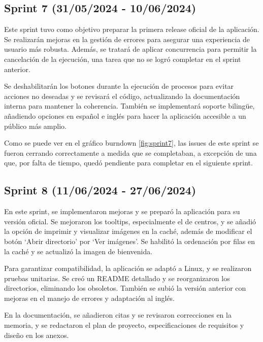 \subsection{Sprint 7 (31/05/2024 - 10/06/2024)}\label{sprint-7}

Este sprint tuvo como objetivo preparar la primera release oficial de la aplicación. Se realizarán mejoras en la gestión de errores para asegurar una experiencia de usuario más robusta. Además, se tratará de aplicar concurrencia para permitir la cancelación de la ejecución, una tarea que no se logró completar en el sprint anterior.

Se deshabilitarán los botones durante la ejecución de procesos para evitar acciones no deseadas y se revisará el código, actualizando la documentación interna para mantener la coherencia. También se implementará soporte bilingüe, añadiendo opciones en español e inglés para hacer la aplicación accesible a un público más amplio.


Como se puede ver en el gráfico burndown \ref{fig:sprint7}, las issues de este sprint se fueron cerrando correctamente a medida que se completaban, a excepción de una que, por falta de tiempo, quedó pendiente para completar en el siguiente sprint.


\subsection{Sprint 8 (11/06/2024 - 27/06/2024)}\label{sprint-8}

En este sprint, se implementaron mejoras y se preparó la aplicación para su versión oficial. Se mejoraron los tooltips, especialmente el de centros, y se añadió la opción de imprimir y visualizar imágenes en la caché, además de modificar el botón `Abrir directorio' por `Ver imágenes'. Se habilitó la ordenación por filas en la caché y se actualizó la imagen de bienvenida.

Para garantizar compatibilidad, la aplicación se adaptó a Linux, y se realizaron pruebas unitarias. Se creó un README detallado y se reorganizaron los directorios, eliminando los obsoletos. También se subió la versión anterior con mejoras en el manejo de errores y adaptación al inglés.

En la documentación, se añadieron citas y se revisaron correcciones en la memoria, y se redactaron el plan de proyecto, especificaciones de requisitos y diseño en los anexos.

